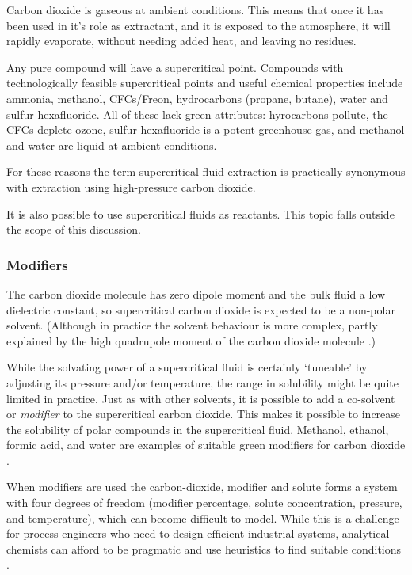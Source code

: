 Carbon dioxide is gaseous at ambient conditions. This means that once it has
been used in it's role as extractant, and it is exposed to the atmosphere, it
will rapidly evaporate, without needing added heat, and leaving no residues.

Any pure compound will have a supercritical point. Compounds with
technologically feasible supercritical points and useful chemical properties
include ammonia, methanol, CFCs/Freon, hydrocarbons (propane, butane), water and
sulfur hexafluoride. All of these lack green attributes: hyrocarbons pollute,
the CFCs deplete ozone, sulfur hexafluoride is a potent greenhouse gas, and
methanol and water are liquid at ambient conditions.

For these reasons the term supercritical fluid extraction is practically
synonymous with extraction using high-pressure carbon dioxide.

It is also possible to use supercritical fluids as reactants. This topic
falls outside the scope of this discussion.
 
\subsubsection{Modifiers}

\label{sec:modifiers}

The carbon dioxide molecule has zero dipole moment and the bulk fluid a low
dielectric constant, so supercritical carbon dioxide is expected to be
a non-polar solvent. (Although in practice the solvent behaviour is more
complex, partly explained by the high quadrupole moment of the carbon dioxide
molecule \autocite{Raveendran2005}.)

While the solvating power of a supercritical fluid is certainly `tuneable' by
adjusting its pressure and/or temperature, the range in solubility might be
quite limited in practice. Just as with other solvents, it is possible to add a
co-solvent or \textit{modifier} to the supercritical carbon dioxide. This makes
it possible to increase the solubility of polar compounds in the supercritical
fluid. Methanol, ethanol, formic acid, and water are examples of suitable green
modifiers for carbon dioxide \autocite{Herrero2010}.

When modifiers are used the carbon-dioxide, modifier and solute forms a system
with four degrees of freedom (modifier percentage, solute concentration,
pressure, and temperature), which can become difficult to model. While this is a
challenge for process engineers who need to design efficient industrial systems,
analytical chemists can afford to be pragmatic and use heuristics to find
suitable conditions \autocite{Wells2003}.

